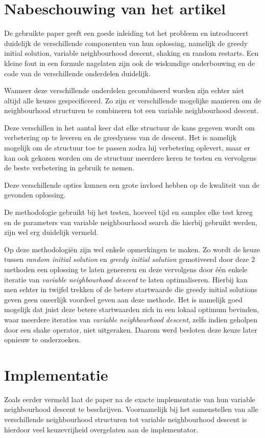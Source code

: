 \documentclass[pdftex,12pt,a4paper]{article}
\begin{document}
\section{Nabeschouwing van het artikel}
De gebruikte paper geeft een goede inleiding tot het probleem en introduceert duidelijk de verschillende componenten van hun oplossing, namelijk de greedy initial solution, variable neighbourhood descent, shaking en random restarts.
Een kleine fout in een formule nagelaten zijn ook de wiskundige onderbouwing en de code van de verschillende onderdelen duidelijk.

Wanneer deze verschillende onderdelen gecombineerd worden zijn echter niet altijd alle keuzes gespecificeerd.
Zo zijn er verschillende mogelijke manieren om de neighbourhood structuren te combineren tot een variable neighbourhood descent.

Deze verschillen in het aantal keer dat elke structuur de kans gegeven wordt om verbetering op te leveren en de greedyness van de descent. Het is namelijk mogelijk om de structuur toe te passen zodra hij verbetering oplevert, maar er kan ook gekozen worden om de structuur meerdere keren te testen en vervolgens de beste verbetering in gebruik te nemen.

Deze verschillende opties kunnen een grote invloed hebben op de kwaliteit van de gevonden oplossing.

De methodologie gebruikt bij het testen, hoeveel tijd en samples elke test kreeg en de parameters van variable neighbourhood search die hierbij gebruikt werden, zijn wel erg duidelijk vermeld.

Op deze methodologi\"en zijn wel enkele opmerkingen te maken. Zo wordt de keuze tussen \emph{random initial solution} en \emph{greedy initial solution} gemotiveerd door deze 2 methoden een oplossing te laten genereren en deze vervolgens door \'e\'en enkele iteratie van \emph{variable neighbourhood descent} te laten optimaliseren. 
Hierbij kan men echter in twijfel trekken of de betere startwaarde die greedy initial solutions geven  geen oneerlijk voordeel geven aan deze methode. Het is namelijk goed mogelijk dat juist deze betere startwaarden zich in een lokaal optimum bevinden, waar meerdere iteraties van \emph{variable neighbourhood descent}, zelfs indien geholpen door een shake operator, niet uitgeraken. Daarom werd besloten deze keuze later opnieuw te onderzoeken.

\section{Implementatie}
Zoals eerder vermeld laat de paper na de exacte implementatie van hun variable neighbourhood descent te beschrijven. Voornamelijk bij het samenstellen van alle verschillende neighbourhood structuren tot variable neighbourhood descent is hierdoor veel keuzevrijheid overgelaten aan de implementator.
\end{document}
